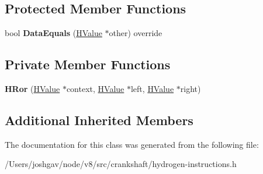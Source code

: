 \subsection*{Protected Member Functions}
\begin{DoxyCompactItemize}
\item 
bool {\bfseries Data\+Equals} (\hyperlink{classv8_1_1internal_1_1_h_value}{H\+Value} $\ast$other) override\hypertarget{classv8_1_1internal_1_1_h_ror_a58472535d6c092dd87bb34ff1bd68772}{}\label{classv8_1_1internal_1_1_h_ror_a58472535d6c092dd87bb34ff1bd68772}

\end{DoxyCompactItemize}
\subsection*{Private Member Functions}
\begin{DoxyCompactItemize}
\item 
{\bfseries H\+Ror} (\hyperlink{classv8_1_1internal_1_1_h_value}{H\+Value} $\ast$context, \hyperlink{classv8_1_1internal_1_1_h_value}{H\+Value} $\ast$left, \hyperlink{classv8_1_1internal_1_1_h_value}{H\+Value} $\ast$right)\hypertarget{classv8_1_1internal_1_1_h_ror_a46141dedd18041fcc969ba75a496f1f6}{}\label{classv8_1_1internal_1_1_h_ror_a46141dedd18041fcc969ba75a496f1f6}

\end{DoxyCompactItemize}
\subsection*{Additional Inherited Members}


The documentation for this class was generated from the following file\+:\begin{DoxyCompactItemize}
\item 
/\+Users/joshgav/node/v8/src/crankshaft/hydrogen-\/instructions.\+h\end{DoxyCompactItemize}

